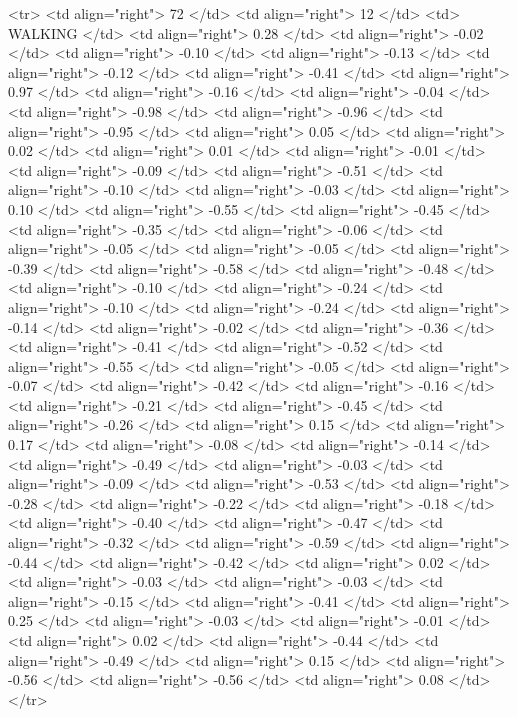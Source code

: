   <tr> <td align="right"> 72 </td> <td align="right">  12 </td> <td> WALKING </td> <td align="right"> 0.28 </td> <td align="right"> -0.02 </td> <td align="right"> -0.10 </td> <td align="right"> -0.13 </td> <td align="right"> -0.12 </td> <td align="right"> -0.41 </td> <td align="right"> 0.97 </td> <td align="right"> -0.16 </td> <td align="right"> -0.04 </td> <td align="right"> -0.98 </td> <td align="right"> -0.96 </td> <td align="right"> -0.95 </td> <td align="right"> 0.05 </td> <td align="right"> 0.02 </td> <td align="right"> 0.01 </td> <td align="right"> -0.01 </td> <td align="right"> -0.09 </td> <td align="right"> -0.51 </td> <td align="right"> -0.10 </td> <td align="right"> -0.03 </td> <td align="right"> 0.10 </td> <td align="right"> -0.55 </td> <td align="right"> -0.45 </td> <td align="right"> -0.35 </td> <td align="right"> -0.06 </td> <td align="right"> -0.05 </td> <td align="right"> -0.05 </td> <td align="right"> -0.39 </td> <td align="right"> -0.58 </td> <td align="right"> -0.48 </td> <td align="right"> -0.10 </td> <td align="right"> -0.24 </td> <td align="right"> -0.10 </td> <td align="right"> -0.24 </td> <td align="right"> -0.14 </td> <td align="right"> -0.02 </td> <td align="right"> -0.36 </td> <td align="right"> -0.41 </td> <td align="right"> -0.52 </td> <td align="right"> -0.55 </td> <td align="right"> -0.05 </td> <td align="right"> -0.07 </td> <td align="right"> -0.42 </td> <td align="right"> -0.16 </td> <td align="right"> -0.21 </td> <td align="right"> -0.45 </td> <td align="right"> -0.26 </td> <td align="right"> 0.15 </td> <td align="right"> 0.17 </td> <td align="right"> -0.08 </td> <td align="right"> -0.14 </td> <td align="right"> -0.49 </td> <td align="right"> -0.03 </td> <td align="right"> -0.09 </td> <td align="right"> -0.53 </td> <td align="right"> -0.28 </td> <td align="right"> -0.22 </td> <td align="right"> -0.18 </td> <td align="right"> -0.40 </td> <td align="right"> -0.47 </td> <td align="right"> -0.32 </td> <td align="right"> -0.59 </td> <td align="right"> -0.44 </td> <td align="right"> -0.42 </td> <td align="right"> 0.02 </td> <td align="right"> -0.03 </td> <td align="right"> -0.03 </td> <td align="right"> -0.15 </td> <td align="right"> -0.41 </td> <td align="right"> 0.25 </td> <td align="right"> -0.03 </td> <td align="right"> -0.01 </td> <td align="right"> 0.02 </td> <td align="right"> -0.44 </td> <td align="right"> -0.49 </td> <td align="right"> 0.15 </td> <td align="right"> -0.56 </td> <td align="right"> -0.56 </td> <td align="right"> 0.08 </td> </tr>
